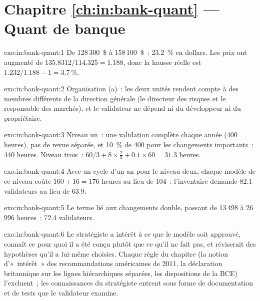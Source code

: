 \section*{Chapitre \ref{ch:in:bank-quant} --- Quant de banque}

\begin{solution}{exo:in:bank-quant:1}
De 128\,300~\$ à 158\,100~\$~: 23.2~\% en dollars. Les prix ont augmenté de $135.8312/114.325=1.188$, donc la hausse réelle est
$1.232/1.188-1=3.7~\%$.
\end{solution}

\begin{solution}{exo:in:bank-quant:2}
Organisation (a)~: les deux unités rendent compte à des membres différents de la direction générale (le directeur des risques et le
responsable des marchés), et le validateur ne dépend ni du développeur ni du propriétaire.
\end{solution}

\begin{solution}{exo:in:bank-quant:3}
Niveau un~: une validation complète chaque année (400 heures), pas de revue séparée, et 10~\% de 400 pour les changements importants~: 440 heures.
Niveau trois~: $60/3+8\times\frac23+0.1\times60=31.3$ heures.
\end{solution}

\begin{solution}{exo:in:bank-quant:4}
Avec un cycle d'un an pour le niveau deux, chaque modèle de ce niveau coûte $160+16=176$ heures au lieu de 104~: l'inventaire demande 82.1
validateurs au lieu de 63.9.
\end{solution}

\begin{solution}{exo:in:bank-quant:5}
Le terme lié aux changements double, passant de 13\,498 à 26\,996 heures~: 72.4 validateurs.
\end{solution}

\begin{solution}{exo:in:bank-quant:6}
Le stratégiste a intérêt à ce que le modèle soit approuvé, connaît ce pour quoi il a été conçu plutôt que ce qu'il ne fait pas,
et réviserait des hypothèses qu'il a lui-même choisies. Chaque règle du chapitre (la notion d'«~intérêt~» des recommandations américaines de 2011, la déclaration britannique sur les
lignes hiérarchiques séparées, les dispositions de la BCE) l'excluent~; les connaissances du stratégiste entrent sous forme de documentation et
de tests que le validateur examine.
\end{solution}

